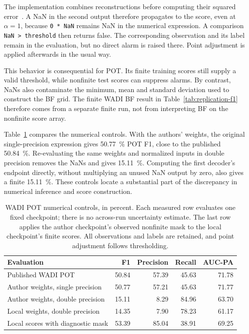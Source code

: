 The implementation combines reconstructions before computing their
squared error~\cite{TranADPlusReferenceCode}. A NaN in the second output
therefore propagates to the score, even at \(\alpha=1\), because
\texttt{0 * NaN} remains NaN in the numerical expression. A comparison
\texttt{NaN > threshold} then returns false. The corresponding observation
and its label remain in the evaluation, but no direct alarm is raised
there. Point adjustment is applied afterwards in the usual way.

This behavior is consequential for \ac{POT}. Its finite training scores
still supply a valid threshold, while nonfinite test scores can suppress
alarms. By contrast, NaNs also contaminate the minimum, mean and standard
deviation used to construct the BF grid. The finite WADI BF result in
Table~\ref{tab:replication-f1} therefore comes from a separate finite run,
not from interpreting BF on the nonfinite score array.

Table~\ref{tab:replication-wadi} compares the numerical controls. With
the authors' weights, the original single-precision expression gives
\SI{50.77}{\percent} \ac{POT} F1, close to the published
\SI{50.84}{\percent}. Re-evaluating the same weights and normalized inputs
in double precision removes the NaNs and gives \SI{15.11}{\percent}.
Computing the first decoder's endpoint directly, without multiplying an
unused NaN output by zero, also gives a finite \SI{15.11}{\percent}.
These controls locate a substantial part of the discrepancy in numerical
inference and score construction.

\begin{table}[htbp]
  \centering
  \small
  \setlength{\tabcolsep}{6pt}
  \begin{tabular}{@{}lrrrr@{}}
    \toprule
    Evaluation & F1 & Precision & Recall & AUC-PA \\
    \midrule
    Published WADI \acs{POT} & \num{50.84} & \num{57.39} & \num{45.63} & \num{71.78} \\
    Author weights, single precision & \num{50.77} & \num{57.21} & \num{45.63} & \num{71.77} \\
    Author weights, double precision & \num{15.11} & \num{8.29} & \num{84.96} & \num{63.70} \\
    Local weights, double precision & \num{14.35} & \num{7.90} & \num{78.23} & \num{61.17} \\
    Local scores with diagnostic mask & \num{53.39} & \num{85.04} & \num{38.91} & \num{69.25} \\
    \bottomrule
  \end{tabular}
  \caption{WADI \acs{POT} numerical controls, in percent. Each measured
  row evaluates one fixed checkpoint; there is no across-run uncertainty
  estimate. The last row applies the author checkpoint's observed
  nonfinite mask to the local checkpoint's finite scores. All observations
  and labels are retained, and point adjustment follows thresholding.}
  \label{tab:replication-wadi}
\end{table}

